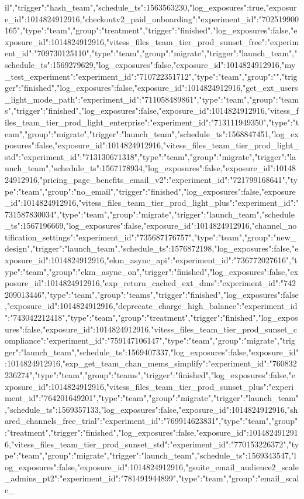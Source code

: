 {il","trigger":"hash_team","schedule_ts":1563563230,"log_exposures":true,"exposure_id":1014824912916},"checkoutv2_paid_onboarding":{"experiment_id":"702519900165","type":"team","group":"treatment","trigger":"finished","log_exposures":false,"exposure_id":1014824912916},"vitess_files_team_tier_prod_sunset_free":{"experiment_id":"709730125110","type":"team","group":"migrate","trigger":"launch_team","schedule_ts":1569279629,"log_exposures":false,"exposure_id":1014824912916},"my_test_experiment":{"experiment_id":"710722351712","type":"team","group":"","trigger":"finished","log_exposures":false,"exposure_id":1014824912916},"get_ext_users_light_mode_path":{"experiment_id":"711058489861","type":"team","group":"teams","trigger":"finished","log_exposures":false,"exposure_id":1014824912916},"vitess_files_team_tier_prod_light_enterprise":{"experiment_id":"713111949350","type":"team","group":"migrate","trigger":"launch_team","schedule_ts":1568847451,"log_exposures":false,"exposure_id":1014824912916},"vitess_files_team_tier_prod_light_std":{"experiment_id":"713130671318","type":"team","group":"migrate","trigger":"launch_team","schedule_ts":1567178934,"log_exposures":false,"exposure_id":1014824912916},"pricing_page_benefits_email_v2":{"experiment_id":"721799168641","type":"team","group":"no_email","trigger":"finished","log_exposures":false,"exposure_id":1014824912916},"vitess_files_team_tier_prod_light_plus":{"experiment_id":"731587830034","type":"team","group":"migrate","trigger":"launch_team","schedule_ts":1567196669,"log_exposures":false,"exposure_id":1014824912916},"channel_notification_settings":{"experiment_id":"735687176757","type":"team","group":"new_design","trigger":"launch_team","schedule_ts":1576872198,"log_exposures":false,"exposure_id":1014824912916},"ekm_async_api":{"experiment_id":"736772027616","type":"team","group":"ekm_async_on","trigger":"finished","log_exposures":false,"exposure_id":1014824912916},"exp_return_cached_ext_dms":{"experiment_id":"742209013446","type":"team","group":"teams","trigger":"finished","log_exposures":false,"exposure_id":1014824912916},"deprecate_charge_high_balance":{"experiment_id":"743042212418","type":"team","group":"treatment","trigger":"finished","log_exposures":false,"exposure_id":1014824912916},"vitess_files_team_tier_prod_sunset_compliance":{"experiment_id":"759147106147","type":"team","group":"migrate","trigger":"launch_team","schedule_ts":1569407337,"log_exposures":false,"exposure_id":1014824912916},"exp_get_team_chan_mems_simplify":{"experiment_id":"760832236274","type":"team","group":"teams","trigger":"finished","log_exposures":false,"exposure_id":1014824912916},"vitess_files_team_tier_prod_sunset_plus":{"experiment_id":"764201649201","type":"team","group":"migrate","trigger":"launch_team","schedule_ts":1569357133,"log_exposures":false,"exposure_id":1014824912916},"shared_channels_free_trial":{"experiment_id":"769914623831","type":"team","group":"treatment","trigger":"finished","log_exposures":false,"exposure_id":1014824912916},"vitess_files_team_tier_prod_sunset_std":{"experiment_id":"770153226372","type":"team","group":"migrate","trigger":"launch_team","schedule_ts":1569343547,"log_exposures":false,"exposure_id":1014824912916},"gsuite_email_audience2_scale_admins_pt2":{"experiment_id":"781491944899","type":"team","group":"email_scale_}
